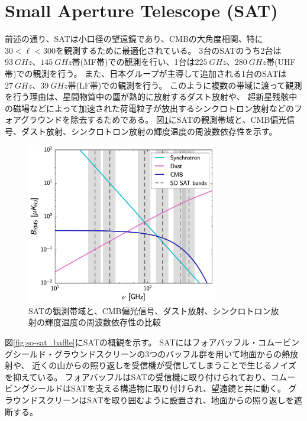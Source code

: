 \documentclass[../../main.tex]{subfiles}
\begin{document}
\section{Small Aperture Telescope (SAT)}
前述の通り、SATは小口径の望遠鏡であり、CMBの大角度相関、特に$30<\ell<300$を観測するために最適化されている。
3台のSATのうち2台は$\SI{93}{GHz}$、$\SI{145}{GHz}$帯(MF帯)での観測を行い、1台は$\SI{225}{GHz}$、$\SI{280}{GHz}$帯(UHF帯)での観測を行う。
また、日本グループが主導して追加される1台のSATは$\SI{27}{GHz}$、$\SI{39}{GHz}$帯(LF帯)での観測を行う。
このように複数の帯域に渡って観測を行う理由は、星間物質中の塵が熱的に放射するダスト放射や、
超新星残骸中の磁場などによって加速された荷電粒子が放出するシンクロトロン放射などのフォアグラウンドを除去するためである。
図\ref{fig:so_noise_freq}にSATの観測帯域と、CMB偏光信号、ダスト放射、シンクロトロン放射の輝度温度の周波数依存性を示す。
\begin{figure}[H]
    \centering
    \includegraphics[width=0.75\textwidth]{simons_observatory/so_noise_freq.pdf}
    \caption{SATの観測帯域と、CMB偏光信号、ダスト放射、シンクロトロン放射の輝度温度の周波数依存性の比較}
    \label{fig:so_noise_freq}
\end{figure}

図\ref{fig:so-sat_baffle}にSATの概観を示す。
SATにはフォアバッフル・コムービングシールド・グラウンドスクリーンの3つのバッフル群を用いて地面からの熱放射や、
近くの山からの照り返しを受信機が受信してしまうことで生じるノイズを抑えている\cite{Kiuchi_2020}。
フォアバッフルはSATの受信機に取り付けられており、コムービングシールドはSATを支える構造物に取り付けられ、望遠鏡と共に動く。
グラウンドスクリーンはSATを取り囲むように設置され、地面からの照り返しを遮断する。
\end{document}
